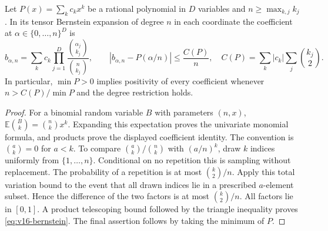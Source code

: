 \begin{lemma}
\label{lem:v16-bernstein}
Let $P(x)=\sum_k c_kx^k$ be a rational polynomial in $D$ variables and
$n\ge\max_{k,j}k_j$. In its tensor Bernstein expansion of degree $n$
in each coordinate the coefficient at $\alpha\in\{0,\ldots,n\}^D$ is
\begin{equation}\label{eq:v16-bernstein}
 b_{\alpha,n}=\sum_k c_k\prod_{j=1}^D
                          \frac{\binom{\alpha_j}{k_j}}{\binom n{k_j}},
 \qquad
 |b_{\alpha,n}-P(\alpha/n)|\le\frac{C(P)}n,
 \quad C(P)=\sum_k|c_k|\sum_j\binom{k_j}{2}.
\end{equation}
In particular, $\min P>0$ implies positivity of every coefficient
whenever $n>C(P)/\min P$ and the degree restriction holds.
\end{lemma}
\begin{proof}
For a binomial random variable $B$ with parameters $(n,x)$,
$\mathbb E\binom Bk=\binom nk x^k$. Expanding this expectation proves
the univariate monomial formula, and products prove the displayed
coefficient identity. The convention is $\binom ak=0$ for $a<k$.
To compare $\binom ak/\binom nk$ with $(a/n)^k$, draw $k$ indices
uniformly from $\{1,\ldots,n\}$. Conditional on no repetition this is
sampling without replacement. The probability of a repetition is at
most $\binom k2/n$. Apply this total variation bound to the event that
all drawn indices lie in a prescribed $a$-element subset. Hence the
difference of the two factors is at most $\binom k2/n$. All factors
lie in $[0,1]$. A product telescoping bound followed by the triangle
inequality proves \eqref{eq:v16-bernstein}. The final assertion follows
by taking the minimum of $P$.
\end{proof}

